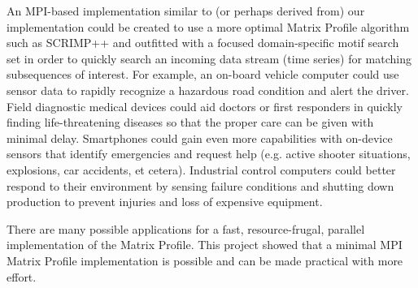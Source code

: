 \documentclass[conference]{IEEEtran}
\begin{document}
An MPI-based implementation similar to (or perhaps derived from) our implementation could be created to use a more optimal Matrix Profile algorithm such as SCRIMP++ and outfitted with a focused domain-specific motif search set in order to quickly search an incoming data stream (time series) for matching subsequences of interest.  For example, an on-board vehicle computer could use sensor data to rapidly recognize a hazardous road condition and alert the driver.  Field diagnostic medical devices could aid doctors or first responders in quickly finding life-threatening diseases so that the proper care can be given with minimal delay.  Smartphones could gain even more capabilities with on-device sensors that identify emergencies and request help (e.g. active shooter situations, explosions, car accidents, et cetera).  Industrial control computers could better respond to their environment by sensing failure conditions and shutting down production to prevent injuries and loss of expensive equipment.  

There are many possible applications for a fast, resource-frugal, parallel implementation of the Matrix Profile.  This project showed that a minimal MPI Matrix Profile implementation is possible and can be made practical with more effort.


\end{document}
